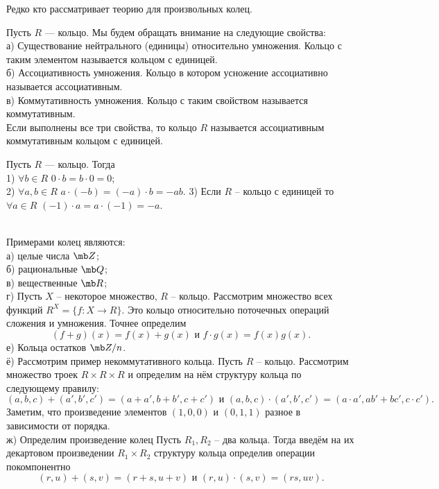 Редко кто рассматривает теорию для произвольных колец.

 Пусть $R$ --- кольцо. Мы будем обращать внимание на следующие свойства:\\
а) Существование нейтрального (единицы) относительно умножения. Кольцо с таким элементом называется кольцом с единицей.\\
б) Ассоциативность умножения. Кольцо в котором усножение ассоциативно называется ассоциативным. \\
в) Коммутативность умножения. Кольцо с таким свойством называется коммутативным.\\
Если выполнены все три свойства, то кольцо $R$ называется ассоциативным коммутативным кольцом с единицей.
\edfn





 Пусть $R$ — кольцо. Тогда \\
1) $\forall b \in R$  $0\cdot b = b\cdot 0 = 0$;\\
2) $\forall a,b \in R$  $a\cdot(-b) = (-a)\cdot b = -ab$.
3) Если $R$ -- кольцо с единицей то $\forall a \in R$  $(-1)\cdot a = a\cdot (-1) = -a$.
\elm





\exm \\
Примерами колец являются:\\
а) целые числа $\mb Z$;\\
б) рациональные $\mb Q$;\\
в) вещественные $\mb R$;\\
г) Пусть $X$ – некоторое множество, $R$ – кольцо. Рассмотрим множество всех функций $R^X=\{f\colon X \to R\}$. Это кольцо относительно поточечных операций сложения и умножения. Точнее определим 
$$(f+g)(x)=f(x)+g(x) \text{ и } f\cdot g(x)=f(x)g(x).$$
е) Кольца остатков $\mb Z/n$.\\
ё) Рассмотрим пример некоммутативного кольца. Пусть $R$ -- кольцо. Рассмотрим множество троек $R\times R\times R$ и определим на нём структуру кольца по следующему правилу:
$$(a,b,c) + (a',b',c')=(a+a',b+b',c+c') \text{ и } (a,b,c) \cdot (a',b',c')=(a\cdot a',ab'+bc',c\cdot c').$$
Заметим, что произведение элементов $(1,0,0)$ и $(0,1,1)$ разное в зависимости от порядка.\\
ж) Определим произведение колец
\dfn Пусть $R_1, R_2$ -- два кольца. Тогда введём на  их декартовом произведении $R_1\times R_2$ структуру кольца определив операции покомпонентно 
$$(r,u)+(s,v)=(r+s,u+v) \text{ и } (r,u)\cdot(s,v)=(rs, uv).$$
\edfn

